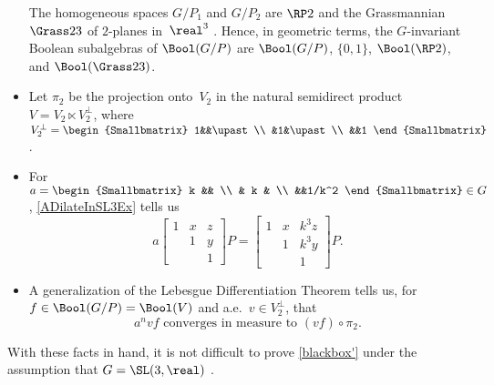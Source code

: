 \begin{itemize}
\begin{rem} \label{GeomInterpG/Pi}
The homogeneous spaces $G/P_1$ and $G/P_2$ are $\RP2$ and the Grassmannian $\Grass23$ of $2$-planes in~$\real^3$ . Hence, in geometric terms, the $G$-invariant Boolean subalgebras of $\Bool(G/P)$ are 
	 $\Bool(G/P)$, $\{0,1\}$, $\Bool(\RP2)$, and $\Bool(\Grass23)$.
\end{rem}

\item Let $\pi_2$ be the projection onto~$V_2$ in the natural semidirect product 
 $V = V_2 \ltimes V_2^\perp$, where $V_2^\perp = \begin{Smallbmatrix} 1&&\upast \\ &1&\upast \\ &&1 \end{Smallbmatrix}$. 

\item For $a = \begin{Smallbmatrix} k && \\ & k & \\ &&1/k^2 \end{Smallbmatrix} \in G$, \cref{ADilateInSL3Ex} tells us
	 \begin{equation} \label{ADilateInSL3}
	 a \begin{bmatrix} 1&x&z \\  &1&y \\ &&1 \end{bmatrix} P
	= \begin{bmatrix} 1&x&k^3 z \\  &1&k^3 y \\ &&1 \end{bmatrix} P 
	. \end{equation}
	\item A generalization of the Lebesgue Differentiation Theorem tells us, for $f \in \Bool(G/P) = \Bool(V)$ and a.e.\ $v \in V_2^\perp$, that
	 $$ \text{$a^n v f$ converges in measure to $(vf) \circ \pi_2$.} $$

\end{itemize}
With these facts in hand, it is not difficult to prove \cref{blackbox'} under the assumption that $G = \SL(3,\real)$ . 





